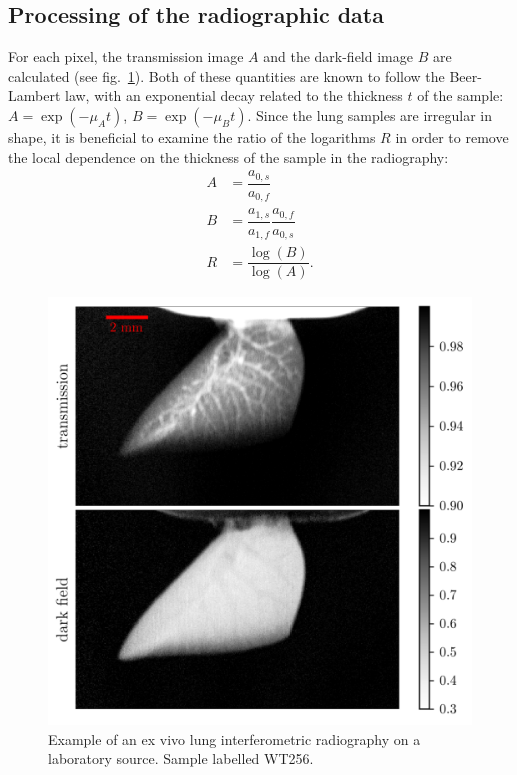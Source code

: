 \subsection{Processing of the radiographic data}\label{sec:radioprocessing}
For each pixel, the transmission image $A$ and the
dark-field image $B$ are calculated (see fig.~\ref{590406}). Both of these
quantities are known to follow the Beer-Lambert law, with an exponential
decay related to the thickness $t$ of the sample: $A = \exp(-\mu_A t)$, $B =
\exp(-\mu_B t)$. Since the lung samples are irregular in shape, it is
beneficial to examine the ratio of the logarithms $R$ in
order to remove the local dependence on the thickness of the sample in the
radiography:
\begin{align}
    A &= \dfrac{a_{0,s}}{a_{0,f}}\\
    B &= \dfrac{a_{1,s}}{a_{1,f}}\dfrac{a_{0,f}}{a_{0,s}}\\
    R &= \dfrac{\log(B)}{\log(A)}.
    \label{eqn:definitions}
\end{align}
\begin{figure}[h!]
\begin{center}
\includegraphics[width=0.70\columnwidth]{gfx/lung-paper-figures/KO373_LL_smoke/WT256_LL_smoke}
\caption{{Example of an ex vivo lung interferometric radiography on a laboratory
source. Sample labelled WT256.
{\label{590406}}%
}}
\end{center}
\end{figure}

